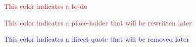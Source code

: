 \documentclass[final,american]{include/RaM/RaM-MScReport}
\begin{document}

\frontmatter


\maketitle

{\huge \textcolor{red}{This color indicates a to-do} 

\textcolor{brown}{This color indicates a place-holder that will be rewritten later} 

\textcolor{blue}{This color indicates a direct quote that will be removed later}}

%
\cleardoublepage



\tableofcontents


\mainmatter










\appendix


\backmatter

%

\label{ch:bib} %
 
\end{document}
